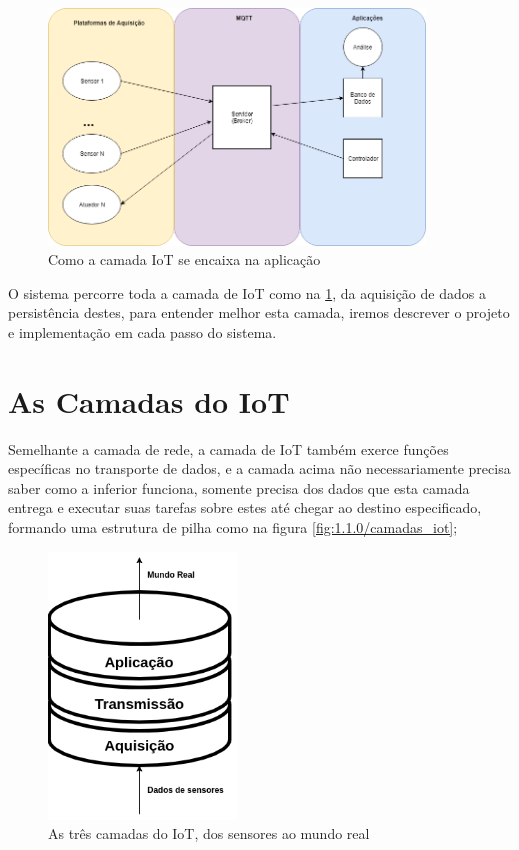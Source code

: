 \begin{figure}[h!]
\centering
\includegraphics[width=10cm]{./02_Capitulos/02_Cap1/figures/iot_app-layers}
\caption{Como a camada IoT se encaixa na aplicação}
\label{fig:1.1.0/iot_app-layers}
\end{figure}


O sistema percorre toda a camada de IoT como na \ref{fig:1.1.0/iot_app-layers}, da aquisição de dados a persistência destes, para entender melhor esta camada, iremos descrever o projeto e implementação em cada passo do sistema.

\section{As Camadas do IoT}
\label{section:camadas_iot}

Semelhante a camada de rede, a camada de IoT também exerce funções específicas no transporte de dados, e a camada acima não necessariamente precisa saber como a inferior funciona, somente precisa dos dados que esta camada entrega e executar suas tarefas sobre estes até chegar ao destino especificado, formando uma estrutura de pilha como na figura \ref{fig:1.1.0/camadas_iot};

\begin{figure}[h!]
\centering
\includegraphics[width=5cm]{./02_Capitulos/02_Cap1/figures/iot_stack}
\caption{As três camadas do IoT, dos sensores ao mundo real}
\label{fig:1.2.0/camadas_iot}
\end{figure}

